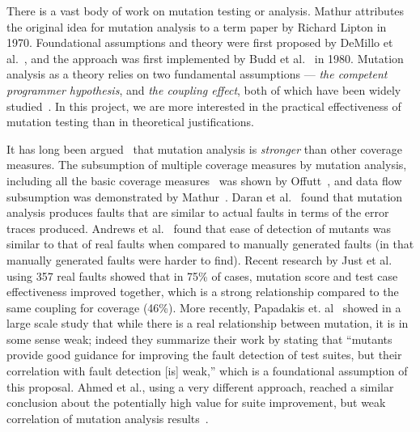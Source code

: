 There is a vast body of work on mutation testing or analysis.  Mathur attributes~\cite{mathur2012foundations} the original idea for mutation analysis
to a term paper by Richard Lipton in 1970. Foundational assumptions and
theory were first proposed by DeMillo et al.~\cite{demillo1978hints},
and the approach was first implemented by Budd et al.~\cite{budd1980theoretical} in 1980.
Mutation analysis as a theory relies on two fundamental
assumptions --- \emph{the competent programmer hypothesis},
and \emph{the coupling effect}, both of which have been widely
studied~\cite{wah2000atheoretical,wah2003ananalysis,gopinath2017the,offutt1989thecoupling,offutt1992investigations,langdon2010efficient,gopinath2017the,gopinath2014mutations}. In
this project, we are more interested in the practical effectiveness of
mutation testing than in theoretical justifications.

It has long been argued~\cite{budd1980mutation} that mutation analysis is \emph{stronger}
than other coverage measures. The subsumption of multiple coverage
measures by mutation analysis, including all the basic coverage measures~\cite{myer1979art}
was shown by Offutt~\cite{offutt1996subsumption}, and data flow
subsumption was demonstrated by Mathur~\cite{mathur1994empirical}.
Daran et al.~\cite{daran1996software} found that mutation analysis produces
faults that are similar to actual faults in terms of the error traces produced. Andrews et
al.~\cite{andrews2005mutation,andrews2006using} found that ease of detection
of mutants was similar to that of real faults when compared to manually
generated faults (in that manually generated faults were harder to find).
Recent research by Just et al.~\cite{just2014mutants} using 357 real faults
showed that in 75\% of cases, mutation score and test case
effectiveness improved together, which is a strong relationship
compared to the same coupling for coverage (46\%).  More recently,
Papadakis et. al~\cite{papadakis2018mutation} showed in a large scale study that while there is a
real relationship between mutation, it is in some sense weak; indeed
they summarize their work by stating that ``mutants provide good guidance for improving the
fault detection of test suites, but their correlation with fault
detection [is] weak,'' which is a foundational assumption of this
proposal.  Ahmed et al., using a very different approach, reached a similar
conclusion about the potentially high value for suite improvement, but weak correlation of mutation
analysis results~\cite{ahmed_testedness}.

